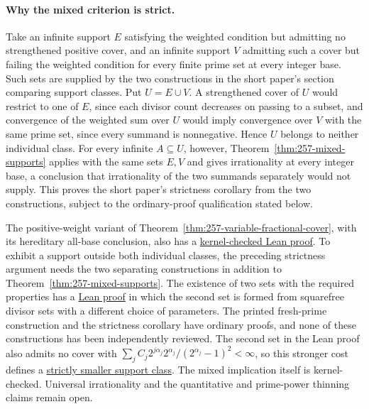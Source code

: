 \documentclass[11pt]{article}
\theoremstyle{plain}
\theoremstyle{definition}
\theoremstyle{remark}
\begin{document}
\paragraph{Why the mixed criterion is strict.}\label{record257:strict-mixed-proof}
Take an infinite support $E$ satisfying the weighted condition but
admitting no strengthened positive cover, and an infinite support $V$
admitting such a cover but failing the weighted condition for every
finite prime set at every integer base. Such sets are supplied by the
two constructions in the short paper's section comparing support classes.
Put $U=E\cup V$. A strengthened cover of $U$ would restrict to one of $E$,
since each divisor count decreases on passing to a subset, and
convergence of the weighted sum over $U$ would imply convergence over $V$
with the same prime set, since every summand is nonnegative. Hence $U$
belongs to neither individual class. For every infinite $A\subseteq U$,
however, Theorem~\ref{thm:257-mixed-supports} applies with the same sets
$E,V$ and gives irrationality at every integer base, a conclusion that
irrationality of the two summands separately would not supply. This
proves the short paper's strictness corollary from the two constructions,
subject to the ordinary-proof qualification stated below.

The positive-weight variant of
Theorem~\ref{thm:257-variable-fractional-cover}, with its hereditary
all-base conclusion, also has a
\href{https://github.com/wcook04/plectis-erdos/blob/c91562bd574a387cde904481e609c7b4cacebb14/lean/ErdosProblems/Erdos257/PaperCompleteR8/ArbitraryWeightMixedClaim.lean#L19}{kernel-checked Lean proof}.
To exhibit a support outside both individual classes, the preceding
strictness argument needs the two separating constructions in addition
to Theorem~\ref{thm:257-mixed-supports}. The existence of two sets with
the required properties has a
\href{https://github.com/wcook04/plectis-erdos/blob/3973d3b10bce72017b8f60093f0d6c3f4f592d80/lean/ErdosProblems/Erdos257/PaperCompleteR8/AnalyticIncomparability.lean#L53}{Lean proof}
in which the second set is formed from squarefree divisor sets with a
different choice of parameters. The printed fresh-prime construction and
the strictness corollary have ordinary proofs, and none of these
constructions has been independently reviewed. The second set in the Lean proof also admits no cover with
$\sum_jC_j2^{j\alpha_j}2^{\alpha_j}/(2^{\alpha_j}-1)^2<\infty$, so this
stronger cost defines a
\href{https://github.com/wcook04/plectis-erdos/blob/3973d3b10bce72017b8f60093f0d6c3f4f592d80/lean/ErdosProblems/Erdos257/PaperCompleteR8/AnalyticIncomparability.lean#L41}{strictly smaller support class}.
The mixed implication itself is kernel-checked.
Universal irrationality and the quantitative and prime-power thinning claims
remain open.
\end{document}
